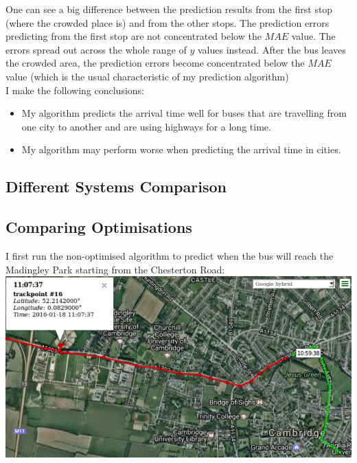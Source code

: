 \documentclass[12pt,a4paper,oneside,openright]{report}
\begin{document}
One can see a big difference between the prediction results from the first stop (where the
crowded place is) and from the other stops. The prediction errors predicting from
the first stop are not concentrated below the $MAE$ value. The errors spread out
across the whole range of $y$ values instead. After the bus leaves the crowded area, the prediction
errors become concentrated below the $MAE$ value (which is the usual characteristic of my
prediction algorithm) \\

I make the following conclusions:

\begin{itemize}

    \item My algorithm predicts the arrival time well for buses that are travelling from one city
    to another and are using highways for a long time.

    \item My algorithm may perform worse when predicting the arrival time in cities.


\end{itemize}



\newpage

\subsection{Different Systems Comparison}

\subsection*{Comparing Optimisations}

I first run the non-optimised algorithm to predict when the bus will reach the
Madingley Park starting from the Chesterton Road: \\

\includegraphics[width=\textwidth]{figs/madingley.png} \\
\end{document}
